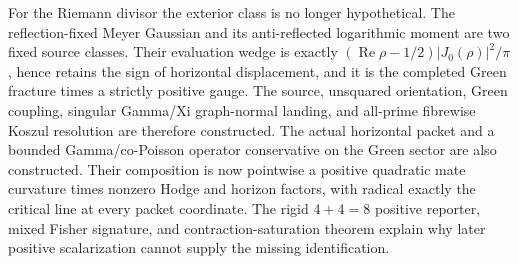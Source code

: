 \documentclass[11pt]{article}
\theoremstyle{definition}
\theoremstyle{remark}
\newcommand{\Rea}{\operatorname{Re}}
\begin{document}
For the Riemann divisor the exterior class is no longer hypothetical.  The
reflection-fixed Meyer Gaussian and its anti-reflected logarithmic moment are
two fixed source classes.  Their evaluation wedge is exactly
\((\Rea\rho-1/2)|J_0(\rho)|^2/\pi\), hence retains the sign of horizontal
displacement, and it is the completed Green fracture times a strictly
positive gauge.  The source, unsquared orientation, Green coupling, singular
Gamma/Xi graph-normal landing, and all-prime fibrewise Koszul resolution are
therefore constructed.  The actual horizontal packet and a bounded
Gamma/co-Poisson operator conservative on the Green sector are also
constructed.  Their composition is now pointwise a positive quadratic mate
curvature times nonzero Hodge and horizon factors, with radical exactly the
critical line at every packet coordinate.  The rigid \(4+4=8\) positive
reporter, mixed Fisher
signature, and contraction-saturation theorem explain why later positive
scalarization cannot supply the missing identification.
\end{document}

